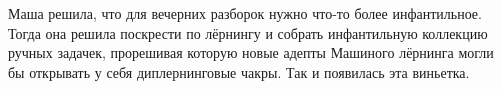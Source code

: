 \documentclass[12pt, a4paper, oneside]{article}
\begin{document}
    Маша решила, что для вечерних разборок нужно что-то более инфантильное. Тогда она решила поскрести по лёрнингу и собрать инфантильную коллекцию ручных задачек, прорешивая которую новые адепты Машиного лёрнинга могли бы открывать у себя диплернинговые чакры. Так и появилась эта виньетка.  
	

\newpage 



\newpage 

% 


% 

\newpage 

% 

\newpage 

% 

\newpage 

% 








\end{document}
